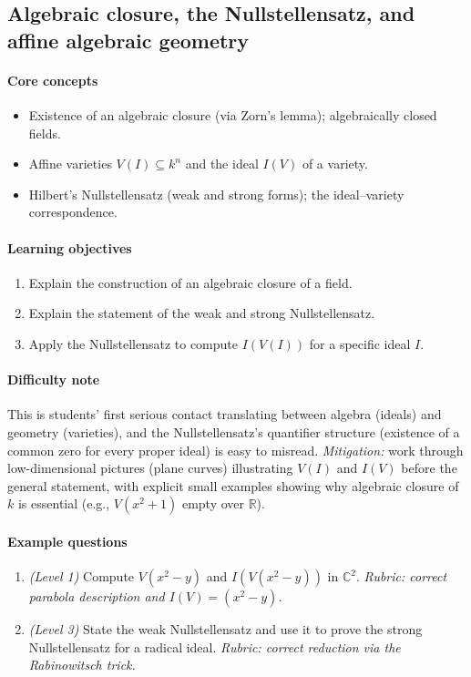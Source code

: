 \documentclass{article}
\begin{document}
\subsection{Algebraic closure, the Nullstellensatz, and affine algebraic geometry}
\paragraph{Core concepts}
\begin{itemize}[nosep]
  \item Existence of an algebraic closure (via Zorn's lemma); algebraically closed fields.
  \item Affine varieties $V(I) \subseteq k^n$ and the ideal $I(V)$ of a variety.
  \item Hilbert's Nullstellensatz (weak and strong forms); the ideal--variety correspondence.
\end{itemize}
\paragraph{Learning objectives}
\begin{enumerate}[nosep]
  \item Explain the construction of an algebraic closure of a field.
  \item Explain the statement of the weak and strong Nullstellensatz.
  \item Apply the Nullstellensatz to compute $I(V(I))$ for a specific ideal $I$.
\end{enumerate}
\paragraph{Difficulty note}
This is students' first serious contact translating between algebra (ideals) and geometry (varieties), and the Nullstellensatz's quantifier structure (existence of a common zero for every proper ideal) is easy to misread. \emph{Mitigation:} work through low-dimensional pictures (plane curves) illustrating $V(I)$ and $I(V)$ before the general statement, with explicit small examples showing why algebraic closure of $k$ is essential (e.g., $V(x^2+1)$ empty over $\mathbb{R}$).
\paragraph{Example questions}
\begin{enumerate}[nosep]
  \item \emph{(Level 1)} Compute $V(x^2 - y)$ and $I(V(x^2-y))$ in $\mathbb{C}^2$. \emph{Rubric: correct parabola description and $I(V) = (x^2-y)$.}
  \item \emph{(Level 3)} State the weak Nullstellensatz and use it to prove the strong Nullstellensatz for a radical ideal. \emph{Rubric: correct reduction via the Rabinowitsch trick.}
\end{enumerate}
\end{document}

